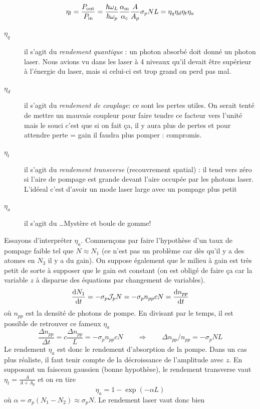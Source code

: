 \begin{equation}
{\eta _l} = \frac{{{P_{{\rm{out}}}}}}{{{P_{{\rm{in}}}}}} = \frac{{\hbar {\omega _L}}}{{\hbar {\omega _p}}}\frac{{{\alpha _{\rm{m}}}}}{{{\alpha _{\rm{c}}}}}\frac{A}{{{A_p}}}{\sigma _p}NL = {\eta _q}{\eta _d}{\eta _t}{\eta _a}
\end{equation}
\begin{description}
\item[$\eta_q$] il s'agit du \textit{rendement quantique} : un photon absorbé doit donné un photon 
laser. Nous avions vu dans les laser à 4 niveaux qu'il devait être supérieur à l'énergie du laser, 
mais si celui-ci est trop grand on perd pas mal.
\item[$\eta_d$] il s'agit du \textit{rendement de couplage}: ce sont les pertes utiles. On serait 
tenté de mettre un mauvais coupleur pour faire tendre ce facteur vers l'unité mais le souci c'est 
que si on fait ça, il y aura plus de pertes et pour attendre perte = gain il faudra plus pomper : 
compromis.
\item[$\eta_t$] il s'agit du \textit{rendement transverse} (recouvrement spatial) : il tend vers 
zéro si l'aire de pompage est grande devant l'aire occupée par les photons laser. L'idéeal c'est 
d'avoir un mode laser large avec un pompage plus petit
\item[$\eta_a$] il s'agit du \dots Mystère et boule de gomme!
\end{description}

Essayons d'interpréter $\eta_a$. Commençons par faire l'hypothèse d'un taux de pompage faible tel
que $N \approx N_1$ (ce n'est pas un problème car dès qu'il y a des atomes en $N_3$ il y a du gain). On suppose également que le milieu à gain est très petit de sorte à supposer que le gain est 
constant (on est obligé de faire ça car la variable $z$ à disparue des équations par changement de 
variables). 
\begin{equation}
\frac{{{\rm{d}}{N_1}}}{{{\rm{d}}t}} =  - {\sigma _p}{{{\cal J}}_p}N =  - {\sigma _p}{n_{pp}}cN = \frac{{{\rm{d}}{n_{pp}}}}{{{\rm{d}}t}}
\end{equation}
où $n_{pp}$ est la densité de photons de pompe. En divisant par le temps, il est possible de retrouver
ce fameux $\eta_a$
\begin{equation}
\frac{{\Delta {n_{pp}}}}{{\Delta t}} = c\frac{{\Delta {n_{pp}}}}{L} =  - {\sigma _p}{n_{pp}}cN\qquad
\Rightarrow\qquad \Delta {n_{pp}}/{n_{pp}} =  - {\sigma _p}NL
\end{equation}
Le rendement $\eta_a$ est donc le rendement d'absorption de la pompe. Dans un cas plus réaliste, il 
faut tenir compte de la décroissance de l'amplitude avec $z$. En supposant un faisceau gaussien 
(bonne hypothèse), le rendement transverse vaut ${\eta _t} = \frac{A}{{A + {A_p}}}$ et on en tire
\begin{equation}
{\eta _a} = 1 - \exp ( - \alpha L)
\end{equation}
où $\alpha = \sigma_p(N_1-N_2) \approx\sigma_pN$. Le rendement laser vaut donc bien\\

